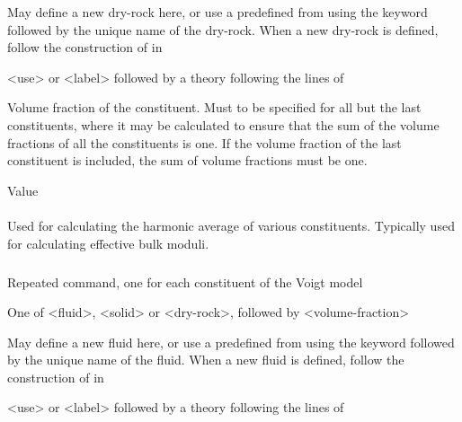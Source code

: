 {
 \slist
   \item \Description  May define a new dry-rock here, or use a predefined  from  using the keyword  followed by the unique name of the dry-rock. When a new dry-rock is defined, follow the construction of  in 
   \item \Argument <use> or <label> followed by a theory following the lines of 
   \item \Default
 \elist

 \slist
   \item \Description Volume fraction of the constituent. Must to be specified for all but the last constituents, where it may be calculated to ensure that the sum of the volume fractions of all the constituents is one. If the volume fraction of the last constituent is included, the sum of volume fractions must be one.
   \item \Argument Value
   \item \Default
 \elist

\paragraph{}
 \slist
   \item \Description Used for calculating the harmonic average of various constituents. Typically used for calculating effective bulk moduli.
   \item \Argument
   \item \Default
 \elist

\subparagraph{}
 \slist
   \item \Description Repeated command, one for each constituent of the Voigt model
   \item \Argument One of <fluid>, <solid> or <dry-rock>, followed by <volume-fraction>
   \item \Default
 \elist

 \slist
   \item \Description May define a new fluid here, or use a predefined  from  using the keyword  followed by the unique name of the fluid. When a new fluid is defined, follow the construction of  in 
   \item \Argument <use> or <label> followed by a theory following the lines of 
   \item \Default
 \elist

}
